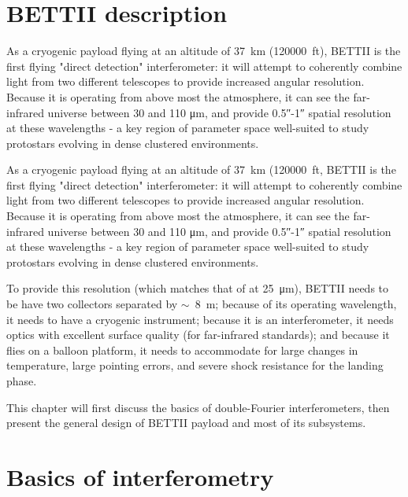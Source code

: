 \section{BETTII description}

As a cryogenic payload flying at an altitude of \SI{37}{\kilo\meter} (\num{120000}~ft), BETTII is the first flying "direct detection" interferometer: it will attempt to coherently combine light from two different telescopes to provide increased angular resolution. Because it is operating from above most the atmosphere, it can see the far-infrared universe between 30 and 110 \si{\micro\meter}, and provide \ang{;;0.5}-\ang{;;1} spatial resolution at these wavelengths - a key region of parameter space well-suited to study protostars evolving in dense clustered environments.

As a cryogenic payload flying at an altitude of \SI{37}{\kilo\meter} (\num{120000}~ft, BETTII is the first flying "direct detection" interferometer: it will attempt to coherently combine light from two different telescopes to provide increased angular resolution. Because it is operating from above most the atmosphere, it can see the far-infrared universe between 30 and 110 \si{\micro\meter}, and provide \ang{;;0.5}-\ang{;;1} spatial resolution at these wavelengths - a key region of parameter space well-suited to study protostars evolving in dense clustered environments.

To provide this resolution (which matches that of \JWST  at \SI{25}{\micro\meter}), BETTII needs to be have two collectors separated by $\sim$~\SI{8}{\meter}; because of its operating wavelength, it needs to have a cryogenic instrument; because it is an interferometer, it needs optics with excellent surface quality (for far-infrared standards); and because it flies on a balloon platform, it needs to accommodate for large changes in temperature, large pointing errors, and severe shock resistance for the landing phase.

This chapter will first discuss the basics of double-Fourier interferometers, then present the general design of BETTII payload and most of its subsystems.


\section{Basics of interferometry}

